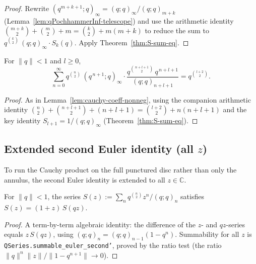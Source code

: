 \begin{proof}\leanok
Rewrite $(q^{m+k+1};q)_\infty = (q;q)_\infty/(q;q)_{m+k}$
(Lemma~\ref{lem:qPochhammerInf-telescope}) and use the arithmetic identity
$\binom{m+k}{2} + \binom{m}{2} + m = \binom{k}{2} + m(m+k)$ to reduce the sum to
$q^{\binom{k}{2}}\,(q;q)_\infty \cdot S_k(q)$. Apply
Theorem~\ref{thm:S-sum-eq}.
\end{proof}

\begin{lemma}\label{lem:cauchy-coeff-neg}\leanok{}
For $\|q\| < 1$ and $l \ge 0$,
\[
  \sum_{n=0}^{\infty}
    q^{\binom{n}{2}}\,(q^{\,n+1};q)_\infty \cdot
    \frac{q^{\binom{n+l+1}{2}}\, q^{\,n+l+1}}{(q;q)_{n+l+1}}
    = q^{\binom{l+2}{2}}.
\]
\end{lemma}

\begin{proof}\leanok
As in Lemma~\ref{lem:cauchy-coeff-nonneg}, using the companion arithmetic
identity $\binom{n}{2} + \binom{n+l+1}{2} + (n+l+1) = \binom{l+2}{2} + n(n+l+1)$
and the key identity $S_{l+1} = 1/(q;q)_\infty$ (Theorem~\ref{thm:S-sum-eq}).
\end{proof}

\subsection{Extended second Euler identity (all \texorpdfstring{$z$}{z})}

To run the Cauchy product on the full punctured disc rather than only the
annulus, the second Euler identity is extended to all $z\in\mathbb{C}$.

\begin{lemma}\label{lem:euler-second-recursion}\leanok{}
For $\|q\| < 1$, the series $S(z) := \sum_n q^{\binom{n}{2}} z^n / (q;q)_n$
satisfies $S(z) = (1+z)\,S(qz)$.
\end{lemma}

\begin{proof}\leanok
A term-by-term algebraic identity: the difference of the $z$- and $qz$-series
equals $z\,S(qz)$, using $(q;q)_{n} = (q;q)_{n-1}(1 - q^{n})$. Summability for
all $z$ is \texttt{QSeries.summable\_euler\_second'}, proved by the ratio
test (the ratio $\|q\|^n\|z\|/\|1 - q^{n+1}\| \to 0$).
\end{proof}

